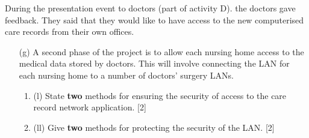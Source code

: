 During the presentation event to doctors (part of activity D). the
doctors gave feedback. They said that they would like to have access
to the new computerised care records from their own offices. 
\begin{enumerate}
\item[(g)] A second phase of the project is to allow each nursing home access
to the medical data stored by doctors. This will involve connecting
the LAN for each nursing home to a number of doctors' surgery LANs. 
\begin{enumerate}
\item (l) State \textbf{two} methods for ensuring the security of access
to the care record network application. \hfill{}{[}2{]}
\item (ll) Give \textbf{two} methods for protecting the security of the
LAN. \hfill{}{[}2{]}
\end{enumerate}
\end{enumerate}